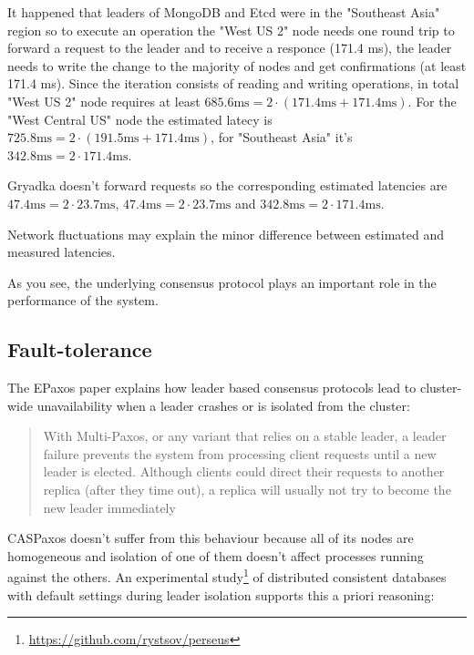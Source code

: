 \documentclass[12pt]{article}
\theoremstyle{definition}
\begin{document}
It happened that leaders of MongoDB and Etcd were in the "Southeast Asia" region so to execute an operation the "West US 2" node needs one round trip to forward a request to the leader and to receive a responce (171.4 ms), the leader needs to write the change to the majority of nodes and get confirmations (at least 171.4 ms). Since the iteration consists of reading and writing operations, in total "West US 2" node requires at least $685.6 \mbox{ms} = 2 \cdot (171.4 \mbox{ms} + 171.4 \mbox{ms})$. For the "West Central US" node the estimated latecy is $725.8 \mbox{ms} = 2 \cdot (191.5 \mbox{ms} + 171.4 \mbox{ms})$, for "Southeast Asia" it's $342.8 \mbox{ms} = 2 \cdot 171.4 \mbox{ms}$.

Gryadka doesn't forward requests so the corresponding estimated latencies are $47.4 \mbox{ms} = 2 \cdot 23.7 \mbox{ms}$, $47.4 \mbox{ms} = 2 \cdot 23.7 \mbox{ms}$ and $342.8 \mbox{ms} = 2 \cdot 171.4 \mbox{ms}$.

Network fluctuations may explain the minor difference between estimated and measured latencies.

As you see, the underlying consensus protocol plays an important role in the performance of the system.

\subsection{Fault-tolerance}

The EPaxos paper explains how leader based consensus protocols lead to cluster-wide unavailability when a leader crashes or is isolated from the cluster:

\begin{quote}
  With Multi-Paxos, or any variant that relies on a stable leader, a leader failure prevents the system from processing client requests until a new leader is elected. Although clients could direct their requests to another replica (after they time out), a replica will usually not try to become the new leader immediately
\end{quote}

CASPaxos doesn't suffer from this behaviour because all of its nodes are homogeneous and isolation of one of them doesn't affect processes running against the others. An experimental study\footnote{\href{https://github.com/rystsov/perseus}{https://github.com/rystsov/perseus}} of distributed consistent databases with default settings during leader isolation supports this a priori reasoning:
\end{document}
